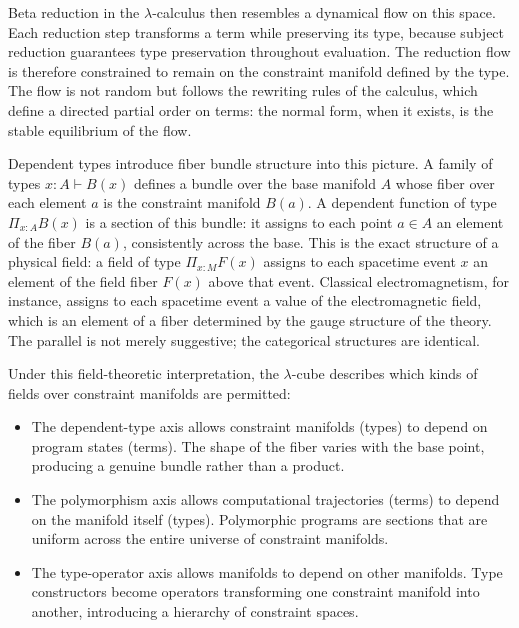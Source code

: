 \documentclass[12pt,a4paper]{article}
\theoremstyle{plain}
\theoremstyle{definition}
\begin{document}
Beta reduction in the $\lambda$-calculus then resembles a dynamical flow on this space. Each reduction step transforms a term while preserving its type, because subject reduction guarantees type preservation throughout evaluation. The reduction flow is therefore constrained to remain on the constraint manifold defined by the type. The flow is not random but follows the rewriting rules of the calculus, which define a directed partial order on terms: the normal form, when it exists, is the stable equilibrium of the flow.

Dependent types introduce fiber bundle structure into this picture. A family of types $x : A \vdash B(x)$ defines a bundle over the base manifold $A$ whose fiber over each element $a$ is the constraint manifold $B(a)$. A dependent function of type $\Pi_{x:A} B(x)$ is a section of this bundle: it assigns to each point $a \in A$ an element of the fiber $B(a)$, consistently across the base. This is the exact structure of a physical field: a field of type $\Pi_{x : M} F(x)$ assigns to each spacetime event $x$ an element of the field fiber $F(x)$ above that event. Classical electromagnetism, for instance, assigns to each spacetime event a value of the electromagnetic field, which is an element of a fiber determined by the gauge structure of the theory. The parallel is not merely suggestive; the categorical structures are identical.

Under this field-theoretic interpretation, the $\lambda$-cube describes which kinds of fields over constraint manifolds are permitted:

\begin{itemize}[leftmargin=2em]
\item The dependent-type axis allows constraint manifolds (types) to depend on program states (terms). The shape of the fiber varies with the base point, producing a genuine bundle rather than a product.

\item The polymorphism axis allows computational trajectories (terms) to depend on the manifold itself (types). Polymorphic programs are sections that are uniform across the entire universe of constraint manifolds.

\item The type-operator axis allows manifolds to depend on other manifolds. Type constructors become operators transforming one constraint manifold into another, introducing a hierarchy of constraint spaces.
\end{itemize}
\end{document}
